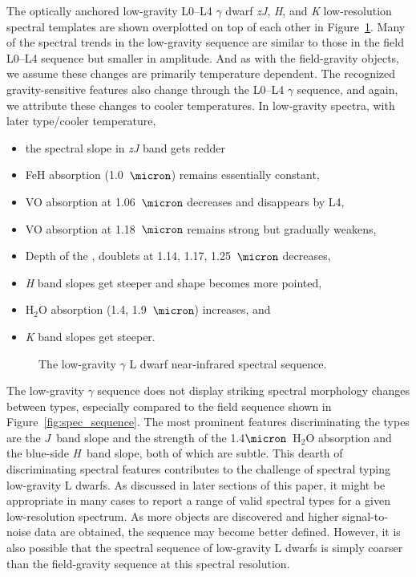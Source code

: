 \documentclass[modern,trackchanges]{aastex61}
\begin{document}
The optically anchored low-gravity L0--L4 $\gamma$ dwarf \emph{zJ}, \emph{H}, and \emph{K} low-resolution spectral templates are shown overplotted on top of each other in Figure~\ref{fig:lg_sequence}.
Many of the spectral trends in the low-gravity sequence are similar to those in the field L0--L4 sequence but smaller in amplitude. And as with the field-gravity objects, we assume these changes are primarily temperature dependent. The recognized gravity-sensitive features also change through the L0--L4 $\gamma$ sequence, and again, we attribute these changes to cooler temperatures.
In low-gravity spectra, with later type/cooler temperature,
\begin{itemize}
\item the spectral slope in \emph{zJ} band gets redder
\item FeH absorption (1.0~$\micron$) remains essentially constant,
\item VO absorption at 1.06~$\micron$ decreases and disappears by L4,
\item VO absorption at 1.18~$\micron$ remains strong but gradually weakens,
\item Depth of the ,  doublets at 1.14, 1.17, 1.25~$\micron$ decreases,
\item \emph{H} band slopes get steeper and shape becomes more pointed,
\item H$_2$O absorption (1.4, 1.9~$\micron$) increases, and
\item \emph{K} band slopes get steeper.
\end{itemize}


\begin{figure}
  \caption{The low-gravity $\gamma$ L dwarf near-infrared spectral sequence.}
  \label{fig:lg_sequence}
\end{figure}

The low-gravity $\gamma$ sequence does not display striking spectral morphology changes between types, especially compared to the field sequence shown in Figure~\ref{fig:spec_sequence}.
The most prominent features discriminating the types are the $J$~band slope and the strength of the 1.4$\micron$~H$_2$O absorption and the blue-side \emph{H}~band slope, both of which are subtle.
This dearth of discriminating spectral features contributes to the challenge of spectral typing low-gravity L dwarfs.
As discussed in later sections of this paper, it might be appropriate in many cases to report a range of valid spectral types for a given low-resolution spectrum.
As more objects are discovered and higher signal-to-noise data are obtained, the sequence may become better defined.
However, it is also possible that the spectral sequence of low-gravity L dwarfs is simply coarser than the field-gravity sequence at this spectral resolution.
\end{document}
